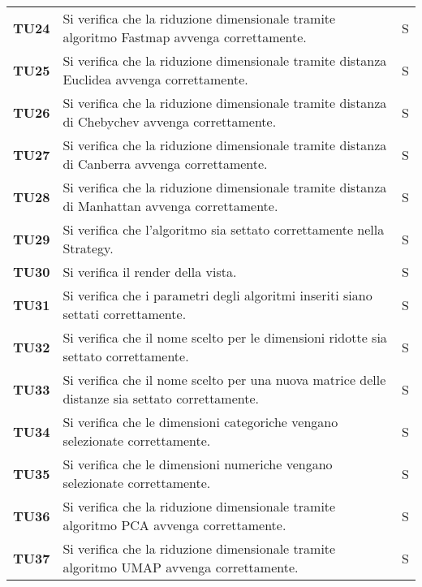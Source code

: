{\begin{longtable}{ C{1.5cm} | C{12cm}| C{1.5cm} }
\textbf{TU24} & 
Si verifica che la riduzione dimensionale tramite algoritmo Fastmap avvenga correttamente. & 
S\\

\textbf{TU25} & 
Si verifica che la riduzione dimensionale tramite distanza Euclidea avvenga correttamente. & 
S\\

\textbf{TU26} & 
Si verifica che la riduzione dimensionale tramite distanza di Chebychev avvenga correttamente. & 
S\\

\textbf{TU27} & 
Si verifica che la riduzione dimensionale tramite distanza di Canberra avvenga correttamente. & 
S\\

\textbf{TU28} & 
Si verifica che la riduzione dimensionale tramite distanza di Manhattan avvenga correttamente. & 
S\\

\textbf{TU29} & 
Si verifica che l'algoritmo sia settato correttamente nella Strategy. & 
S\\

\textbf{TU30} & 
Si verifica il render della vista. & 
S\\

\textbf{TU31} & 
Si verifica che i parametri degli algoritmi inseriti siano settati correttamente. & 
S\\

\textbf{TU32} & 
Si verifica che il nome scelto per le dimensioni ridotte sia settato correttamente. & 
S\\

\textbf{TU33} & 
Si verifica che il nome scelto per una nuova matrice delle distanze sia settato correttamente. & 
S\\

\textbf{TU34} & 
Si verifica che le dimensioni categoriche vengano selezionate correttamente. & 
S\\

\textbf{TU35} & 
Si verifica che le dimensioni numeriche vengano selezionate correttamente. & 
S\\

\textbf{TU36} & 
Si verifica che la riduzione dimensionale tramite algoritmo PCA avvenga correttamente. & 
S\\

\textbf{TU37} & 
Si verifica che la riduzione dimensionale tramite algoritmo UMAP avvenga correttamente. & 
S\\


\end{longtable}}
